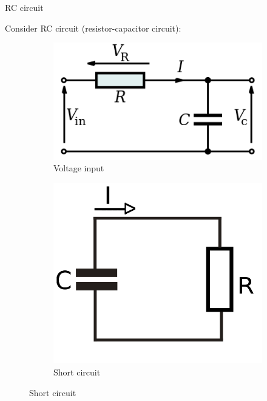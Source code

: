 \documentclass{beamer}
\begin{document}
\begin{frame}{RC circuit}
	\begin{flushleft}
		
		Consider RC circuit (resistor-capacitor circuit):
\begin{figure}
	\centering
	\begin{subfigure}[b]{0.5\textwidth}
		\centering
		\includegraphics[width=\textwidth]{RC_1}
		\caption{Voltage input}
	\end{subfigure}
	\begin{subfigure}[b]{0.3\textwidth}
		\centering
		\includegraphics[width=\textwidth]{RC_2}
		\caption{Short circuit}
	\end{subfigure}
\end{figure}
		
	\end{flushleft}
\end{frame}
\end{document}
